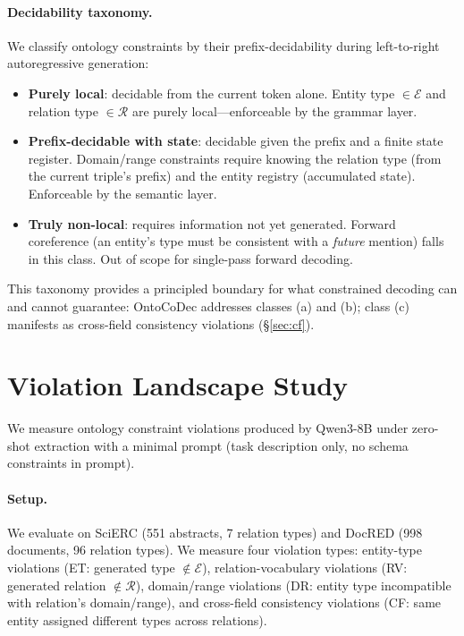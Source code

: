 \documentclass[11pt,a4paper]{article}
\newcommand{\sys}{OntoCoDec\xspace}
\begin{document}
\paragraph{Decidability taxonomy.}
We classify ontology constraints by their prefix-decidability during left-to-right autoregressive generation:
\begin{itemize}[nosep]
    \item[\textbf{(a)}] \textbf{Purely local}: decidable from the current token alone. Entity type $\in \mathcal{E}$ and relation type $\in \mathcal{R}$ are purely local---enforceable by the grammar layer.
    \item[\textbf{(b)}] \textbf{Prefix-decidable with state}: decidable given the prefix and a finite state register. Domain/range constraints require knowing the relation type (from the current triple's prefix) and the entity registry (accumulated state). Enforceable by the semantic layer.
    \item[\textbf{(c)}] \textbf{Truly non-local}: requires information not yet generated. Forward coreference (an entity's type must be consistent with a \emph{future} mention) falls in this class. Out of scope for single-pass forward decoding.
\end{itemize}
This taxonomy provides a principled boundary for what constrained decoding can and cannot guarantee: \sys addresses classes (a) and (b); class (c) manifests as cross-field consistency violations (\S\ref{sec:cf}).

\section{Violation Landscape Study}
\label{sec:landscape}

We measure ontology constraint violations produced by Qwen3-8B under zero-shot extraction with a minimal prompt (task description only, no schema constraints in prompt).

\paragraph{Setup.}
We evaluate on SciERC (551 abstracts, 7 relation types) and DocRED (998 documents, 96 relation types).
We measure four violation types: entity-type violations (ET: generated type $\notin \mathcal{E}$), relation-vocabulary violations (RV: generated relation $\notin \mathcal{R}$), domain/range violations (DR: entity type incompatible with relation's domain/range), and cross-field consistency violations (CF: same entity assigned different types across relations).
\end{document}
